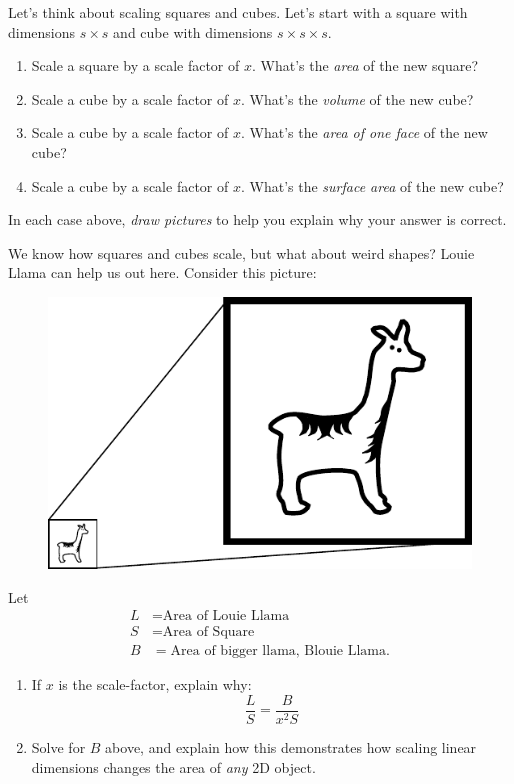 \documentclass[handout,nooutcomes,noauthor,hints]{../ximera}
\begin{document}
\begin{question}
  Let's think about scaling squares and cubes. Let's start with a square with dimensions $s\times s$ and cube with dimensions $s\times s\times s$.

  \begin{enumerate}
  \item Scale a square by a scale factor of $x$. What's the \emph{area} of the new square?
  \item Scale a cube by a scale factor of $x$. What's the \emph{volume} of the new cube?
  \item Scale a cube by a scale factor of $x$. What's the \emph{area of one face} of the new cube?
  \item Scale a cube by a scale factor of $x$. What's the \emph{surface area} of the new cube?
  \end{enumerate}
  In each case above, \emph{draw pictures} to help you explain why your
  answer is correct.
\end{question}
\mynewpage

\begin{question}
  We know how squares and cubes scale, but what about weird shapes?
  Louie Llama can help us out here.  Consider this picture:

\begin{figure}[h]
  \begin{center}
 \includegraphics{llamaScaled.pdf}
   \end{center}
\end{figure}

  Let
  \begin{align*}
    L &= \text{Area of Louie Llama}\\
    S &= \text{Area of Square}\\
    B &= \text{Area of bigger llama, Blouie Llama}.
  \end{align*}
  \begin{enumerate}
  \item If $x$ is the scale-factor, explain why:
    \[
    \frac{L}{S} = \frac{B}{x^2 S}
    \]
  \item Solve for $B$ above, and explain how this demonstrates how
    scaling linear dimensions changes the area of \emph{any} 2D object.
  \end{enumerate}
  
\end{question}
\mynewpage
\end{document}
